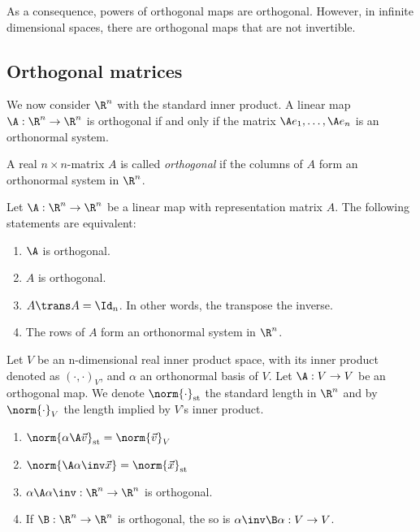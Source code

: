 \begin{remark}
    As a consequence, powers of orthogonal maps are orthogonal. However, in infinite dimensional spaces, there are orthogonal maps that are not invertible.
\end{remark}

\subsection{Orthogonal matrices}
\begin{corollary}
    We now consider $\R^n$ with the standard inner product. A linear map $\A: \R^n \to \R^n$ is orthogonal if and only if the matrix $\A e_1, \dots, \A e_n$ is an orthonormal system.
\end{corollary}

\begin{definition}
    A real $n \times n$-matrix $A$ is called \emph{orthogonal} if the columns of $A$ form an orthonormal system in $\R^n$.
\end{definition}

\begin{theorem}
    Let $\A: \R^n \to \R^n$ be a linear map with representation matrix $A$. The following statements are equivalent: 
    \begin{enumerate}
        \item $\A$ is orthogonal.
        \item $A$ is orthogonal.
        \item $A\trans A = \Id_n$. In other words, the transpose the inverse.
        \item The rows of $A$ form an orthonormal system in $\R^n$.
    \end{enumerate}
\end{theorem}

\begin{lemma}
    Let $V$ be an n-dimensional real inner product space, with its inner product denoted as $(\cdot, \cdot)_V$, and $\alpha$ an orthonormal basis of $V$. 
    Let $\A:V \to V$ be an orthogonal map. We denote $\norm{\cdot}_\text{st}$ the standard length in $\R^n$ and by $\norm{\cdot}_V$ the length implied by $V$'s inner product.
    \begin{enumerate}
        \item $\norm{\alpha{\A\vec{v}}}_\text{st} = \norm{\vec{v}}_V$
        \item $\norm{\A\alpha\inv\vec{x}} = \norm{\vec{x}}_\text{st}$
        \item $\alpha \A \alpha\inv: \R^n \to \R^n$ is orthogonal.
        \item If $\B: \R^n \to \R^n$ is orthogonal, the so is $\alpha\inv\B\alpha:V \to V$.
    \end{enumerate}
\end{lemma}

